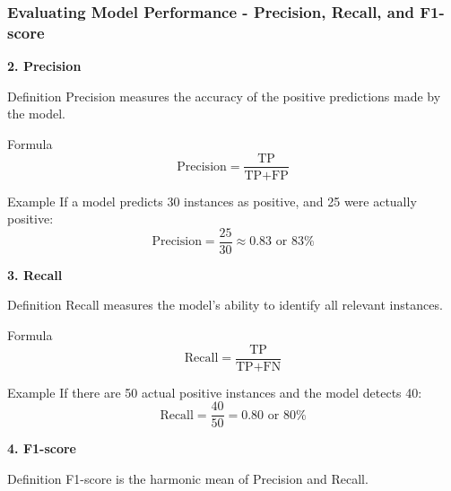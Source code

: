 \documentclass[aspectratio=169]{beamer}
\begin{document}
\begin{frame}[fragile]
    \frametitle{Evaluating Model Performance - Precision, Recall, and F1-score}
    \textbf{2. Precision}

    \begin{block}{Definition}
        Precision measures the accuracy of the positive predictions made by the model.
    \end{block}

    \begin{block}{Formula}
        \begin{equation}
            \text{Precision} = \frac{\text{TP}}{\text{TP} + \text{FP}} 
        \end{equation}
    \end{block}

    \begin{block}{Example}
        If a model predicts 30 instances as positive, and 25 were actually positive:
        \begin{equation}
            \text{Precision} = \frac{25}{30} \approx 0.83 \text{ or } 83\%
        \end{equation}
    \end{block}

    \textbf{3. Recall}

    \begin{block}{Definition}
        Recall measures the model’s ability to identify all relevant instances.
    \end{block}

    \begin{block}{Formula}
        \begin{equation}
            \text{Recall} = \frac{\text{TP}}{\text{TP} + \text{FN}} 
        \end{equation}
    \end{block}

    \begin{block}{Example}
        If there are 50 actual positive instances and the model detects 40:
        \begin{equation}
            \text{Recall} = \frac{40}{50} = 0.80 \text{ or } 80\%
        \end{equation}
    \end{block}

    \textbf{4. F1-score}

    \begin{block}{Definition}
        F1-score is the harmonic mean of Precision and Recall.
    \end{block}


\end{frame}
\end{document}
